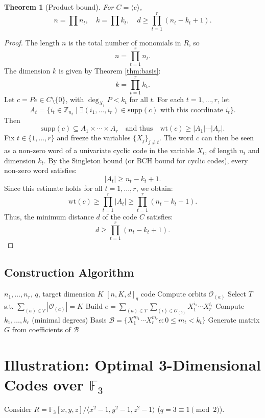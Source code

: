 \documentclass[10pt,twocolumn]{IEEEtran}
\theoremstyle{plain}
\newtheorem{thm}{Theorem}[section]
\theoremstyle{definition}
\newcommand{\Zn}[1]{\mathbb{Z}_{#1}}
\newcommand{\wt}{\mathrm{wt}}
\newcommand{\supp}{\mathrm{supp}}
\newcommand{\orb}{\mathcal{O}}
\begin{document}
\begin{thm}[Product bound]\label{thm:bound}
For $C = \langle e \rangle$,
\[
n = \prod n_t, \quad k = \prod k_t, \quad d \ge \prod_{t=1}^r (n_t - k_t + 1).
\]
\end{thm}
\begin{proof}
The length $n$ is the total number of monomials in $R$, so
\[
n = \prod_{t=1}^r n_t.
\]
The dimension $k$ is given by Theorem \ref{thm:basis}:
\[
k = \prod_{t=1}^r k_t.
\]
Let $c = P e \in C \setminus \{0\}$, with $\deg_{X_t} P < k_t$ for all $t$.
For each $t = 1,\dots,r$, let
\[
A_t = \{ i_t \in \Zn{n_t} \mid \exists (i_1,\dots,i_r) \in \supp(c)
\text{ with this coordinate } i_t \}.
\]
Then
\[
\supp(c) \subseteq A_1 \times \cdots \times A_r
\quad\text{and thus}\quad
\wt(c) \ge |A_1|\cdots |A_r|.
\]
Fix $t \in \{1,\dots,r\}$ and freeze the variables $\{X_j\}_{j \neq t}$.
The word $c$ can then be seen as a non-zero word of a univariate cyclic code in the variable $X_t$, of length $n_t$ and dimension $k_t$.
By the Singleton bound (or BCH bound for cyclic codes), every non-zero word satisfies:
\[
|A_t| \ge n_t - k_t + 1.
\]
Since this estimate holds for all $t=1,\dots,r$, we obtain:
\[
\wt(c) \ge \prod_{t=1}^r |A_t|
\ge \prod_{t=1}^r (n_t - k_t + 1).
\]
Thus, the minimum distance $d$ of the code $C$ satisfies:
\[
d \ge \prod_{t=1}^r (n_t - k_t + 1).
\]
\end{proof}

\subsection{Construction Algorithm}
\begin{algorithm}
\caption{Construction of $r$-dim multicyclic codes}\label{algo:gen}
\begin{algorithmic}[1]
\Require $n_1,\dots,n_r$, $q$, target dimension $K$
\Ensure $[n,K,d]_q$ code
\State Compute orbits $\orb_{(a)}$ \cite{lidl1997}
\State Select $T$ s.t. $\sum_{(a)\in T} |\orb_{(a)}| = K$
\State Build $e = \sum_{(a)\in T} \sum_{(i)\in\orb_{(a)}} X_1^{i_1}\cdots X_r^{i_r}$
\State Compute $k_1,\dots,k_r$ (minimal degrees)
\State Basis $\mathcal{B} = \{X_1^{m_1}\cdots X_r^{m_r} e : 0\le m_t < k_t\}$
\State Generate matrix $G$ from coefficients of $\mathcal{B}$
\end{algorithmic}
\end{algorithm}

\section{Illustration: Optimal 3-Dimensional Codes over $\mathbb{F}_3$}
Consider $R = \mathbb{F}_3[x,y,z]/\langle x^2-1,y^2-1,z^2-1\rangle$ ($q=3\equiv1\pmod{2}$).
\end{document}
